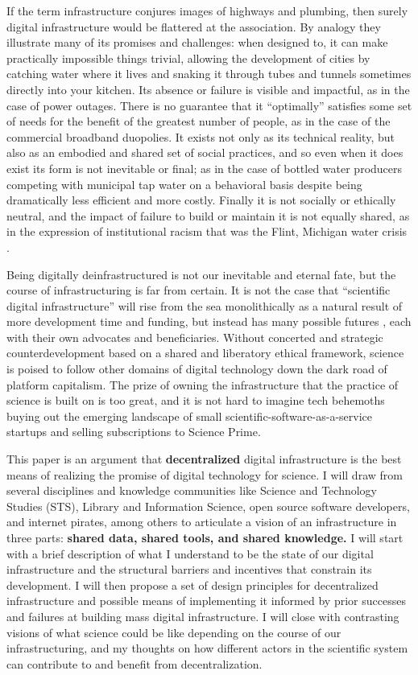 \documentclass[10pt]{tufte-book}
\begin{document}
If the term infrastructure conjures images of highways and plumbing,
then surely digital infrastructure would be flattered at the
association. By analogy they illustrate many of its promises and
challenges: when designed to, it can make practically impossible things
trivial, allowing the development of cities by catching water where it
lives and snaking it through tubes and tunnels sometimes directly into
your kitchen. Its absence or failure is visible and impactful, as in the
case of power outages. There is no guarantee that it ``optimally''
satisfies some set of needs for the benefit of the greatest number of
people, as in the case of the commercial broadband duopolies. It exists
not only as its technical reality, but also as an embodied and shared
set of social practices, and so even when it does exist its form is not
inevitable or final; as in the case of bottled water producers competing
with municipal tap water on a behavioral basis despite being
dramatically less efficient and more costly. Finally it is not socially
or ethically neutral, and the impact of failure to build or maintain it
is not equally shared, as in the expression of institutional racism that
was the Flint, Michigan water crisis \citep{michicancivilrightscommissionFlintWaterCrisis2017} .

Being digitally deinfrastructured is not our inevitable and eternal
fate, but the course of infrastructuring is far from certain. It is not
the case that ``scientific digital infrastructure'' will rise from the
sea monolithically as a natural result of more development time and
funding, but instead has many possible futures\citep{mirowskiFutureOpenScience2018} , each with their own advocates and
beneficiaries. Without concerted and strategic counterdevelopment based
on a shared and liberatory ethical framework, science is poised to
follow other domains of digital technology down the dark road of
platform capitalism. The prize of owning the infrastructure that the
practice of science is built on is too great, and it is not hard to
imagine tech behemoths buying out the emerging landscape of small
scientific-software-as-a-service startups and selling subscriptions to
Science Prime.

This paper is an argument that \textbf{decentralized} digital
infrastructure is the best means of realizing the promise of digital
technology for science. I will draw from several disciplines and
knowledge communities like Science and Technology Studies (STS), Library
and Information Science, open source software developers, and internet
pirates, among others to articulate a vision of an infrastructure in
three parts: \textbf{shared data, shared tools, and shared knowledge.} I
will start with a brief description of what I understand to be the state
of our digital infrastructure and the structural barriers and incentives
that constrain its development. I will then propose a set of design
principles for decentralized infrastructure and possible means of
implementing it informed by prior successes and failures at building
mass digital infrastructure. I will close with contrasting visions of
what science could be like depending on the course of our
infrastructuring, and my thoughts on how different actors in the
scientific system can contribute to and benefit from decentralization.
\end{document}
